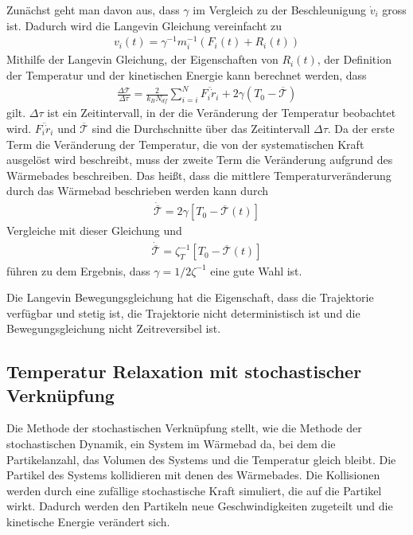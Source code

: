 \documentclass[]{article}
\begin{document}
Zunächst geht man davon aus, dass $\gamma$ im Vergleich zu der Beschleunigung $\dot{v}_i$ gross ist. Dadurch wird die Langevin Gleichung vereinfacht zu 
\begin{align*}
	v_i(t) = \gamma^{-1} m_i^{-1} (F_i(t) + R_i(t) )
\end{align*}
Mithilfe der Langevin Gleichung, der Eigenschaften von $R_i(t)$, der Definition der Temperatur und der kinetischen Energie kann berechnet werden, dass 
\begin{align*}
	\frac{\Delta \mathcal{T}}{\Delta \tau} = \frac{2}{k_B N_{df}} \sum\limits_{i=i}^N \overline{F_i \dot{r}_i} + 2 \gamma (T_0 - \overline{\mathcal{T}})  
\end{align*} 
gilt. $\Delta \tau$ ist ein Zeitintervall, in der die Veränderung der Temperatur beobachtet wird. $\overline{F_i \dot{r}_i} $ und $\overline{\mathcal{T}}$ sind die Durchschnitte über das Zeitintervall $\Delta \tau$. Da der erste Term die Veränderung der Temperatur, die von der systematischen Kraft ausgelöst wird beschreibt, muss der zweite Term die Veränderung aufgrund des Wärmebades beschreiben. 
Das heißt, dass die mittlere Temperaturveränderung durch das Wärmebad beschrieben werden kann durch
\begin{align*}
	\dot{ \overline{\mathcal{T}} } = 2 \gamma [T_0 - \overline{\mathcal{T}}(t)]  
\end{align*}
Vergleiche mit dieser Gleichung und 
\begin{align*}
 \dot{ \overline{\mathcal{T}} } = \zeta_T^{-1} [T_0 - \overline{\mathcal{T}}(t)] 
\end{align*}
führen zu dem Ergebnis, dass $\gamma = 1/2 \zeta^{-1}$ eine gute Wahl ist. 

Die Langevin Bewegungsgleichung hat  die Eigenschaft, dass die Trajektorie verfügbar und stetig ist, die Trajektorie nicht deterministisch ist und die Bewegungsgleichung nicht Zeitreversibel ist. %


\subsection{Temperatur Relaxation mit stochastischer Verknüpfung}

Die Methode der stochastischen Verknüpfung stellt, wie die Methode der stochastischen Dynamik, ein System im Wärmebad da, bei dem die Partikelanzahl, das Volumen des Systems und die Temperatur gleich bleibt. Die Partikel des Systems kollidieren mit denen des Wärmebades. Die Kollisionen werden durch eine zufällige stochastische Kraft simuliert, die auf die Partikel wirkt. Dadurch werden den Partikeln neue Geschwindigkeiten zugeteilt und die kinetische Energie verändert sich. 
\end{document}
